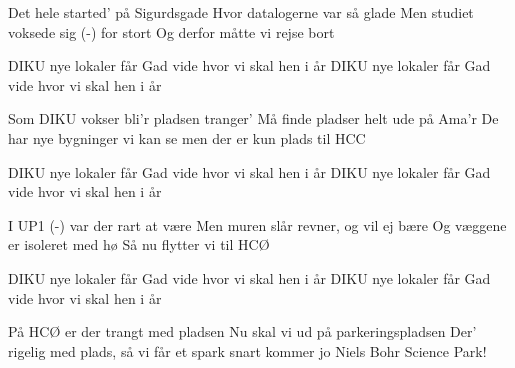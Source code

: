 \documentclass[a4paper,11pt]{article}
\begin{document}
\begin{song}


   Det hele started' på Sigurdsgade
             Hvor datalogerne var så glade
   Men studiet voksede sig (-) for stort
             Og derfor måtte vi rejse bort


   DIKU nye lokaler får
                Gad vide hvor vi skal hen i år
   DIKU nye lokaler får
               Gad vide hvor vi skal hen i år

   Som DIKU vokser bli'r pladsen tranger'
             Må finde pladser helt ude på Ama'r
   De har nye bygninger vi kan se
             men der er kun plads til HCC


   DIKU nye lokaler får
                Gad vide hvor vi skal hen i år
   DIKU nye lokaler får
               Gad vide hvor vi skal hen i år

   I UP1 (-) var der rart at være
             Men muren slår revner, og vil ej bære
   Og væggene er isoleret med hø
             Så nu flytter vi til HCØ


   DIKU nye lokaler får
                Gad vide hvor vi skal hen i år
   DIKU nye lokaler får
               Gad vide hvor vi skal hen i år

   På HCØ er der trangt med pladsen
             Nu skal vi ud på parkeringspladsen
   Der' rigelig med plads, så vi får et spark
             snart kommer jo Niels Bohr Science Park!



\end{song}
\end{document}
